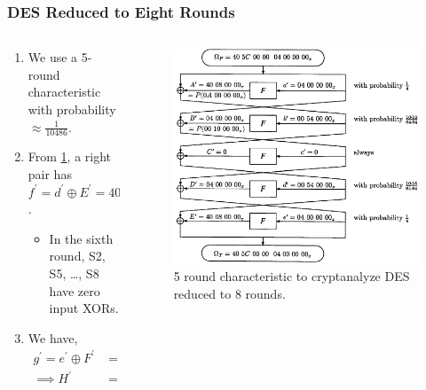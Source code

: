 \documentclass{beamer}
\begin{document}
    \begin{frame}
        \frametitle{DES Reduced to Eight Rounds}
        \begin{columns}
            \begin{column}{0.6\linewidth}
                \begin{enumerate}
                    \item We use a 5-round characteristic with probability
                    \(\approx \frac{1}{10486}\).
                    \item From \cref{fig:des-8rd-char}, a right pair has
                    \(f^\prime = d^\prime \oplus E^\prime = 40\ 5C\ 00\ 00_x\).
                    \begin{itemize}
                        \item In the sixth round, S2, S5, \dots, S8 have zero
                        input XORs.
                    \end{itemize}
                    \item We have,
                    \begin{align}
                        g^\prime = e^\prime \oplus F^\prime &= H^\prime \oplus l^\prime \\
                        \implies H^\prime &= e^\prime \oplus F^\prime \oplus l^\prime.
                    \end{align}
                \end{enumerate}
            \end{column}
            \begin{column}{0.4\linewidth}
                \begin{figure}[!ht]
                    \centering
                    \includegraphics[width=\columnwidth]{images/des_8round_char.png}
                    \caption{5 round characteristic to cryptanalyze DES reduced to 8 rounds.}
                    \label{fig:des-8rd-char}
                \end{figure}
            \end{column}
        \end{columns}
    \end{frame}
\end{document}
